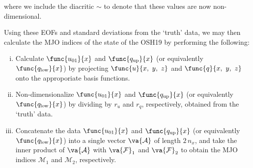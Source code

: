 where we include the diacritic $\sim$ to denote that these values are now non-dimensional. 

Using these EOFs and standard deviations from the `truth' data, we may then calculate the MJO indices of the state of the OSH19 by performing the following:
\begin{enumerate}[(i)]
	\item Calculate $\func{u_{01}}{x}$ and $\func{q_{\text{up}}}{x}$ (or equivalently $\func{q_{\text{low}}}{x}$) by projecting $\func{u}{x,\ y,\ z}$ and $\func{q}{x,\ y,\ z}$ onto the approporiate basis functions.
	\item Non-dimensionalize $\func{u_{01}}{x}$ and $\func{q_{\text{up}}}{x}$ (or equivalently $\func{q_{\text{low}}}{x}$) by dividing by $r_u$ and $r_q$, respectively, obtained from the `truth' data.
	\item Concatenate the data $\func{u_{01}}{x}$ and $\func{q_{\text{up}}}{x}$ (or equivalently $\func{q_{\text{low}}}{x}$) into a single vector $\va{\mathcal{A}}$ of length $2\,n_x$, and take the inner product of $\va{\mathcal{A}}$ with $\va{\mathcal{F}}_1$ and $\va{\mathcal{F}}_2$ to obtain the MJO indices $\mathcal{M}_1$ and $\mathcal{M}_2$, respectively.
\end{enumerate}